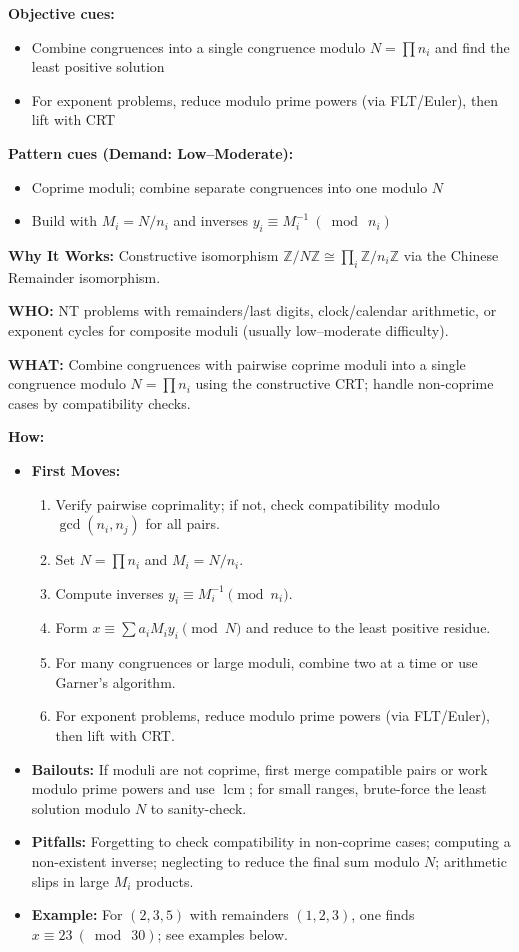 \documentclass[12pt]{article}
\begin{document}
\textbf{Objective cues:}
\begin{itemize}
    \item Combine congruences into a single congruence modulo $N=\prod n_i$ and find the least positive solution
    \item For exponent problems, reduce modulo prime powers (via FLT/Euler), then lift with CRT
\end{itemize}

\textbf{Pattern cues (Demand: Low–Moderate):}
\begin{itemize}
    \item Coprime moduli; combine separate congruences into one modulo $N$
    \item Build with $M_i=N/n_i$ and inverses $y_i\equiv M_i^{-1}\ (\bmod\ n_i)$
\end{itemize}

\textbf{Why It Works:} Constructive isomorphism $\mathbb{Z}/N\mathbb{Z} \cong \prod_i \mathbb{Z}/n_i\mathbb{Z}$ via the Chinese Remainder isomorphism.

\textbf{WHO:} NT problems with remainders/last digits, clock/calendar arithmetic, or exponent cycles for composite moduli (usually low–moderate difficulty).

\textbf{WHAT:} Combine congruences with pairwise coprime moduli into a single congruence modulo $N=\prod n_i$ using the constructive CRT; handle non-coprime cases by compatibility checks.


\textbf{How:}
\begin{itemize}
    \item \textbf{First Moves:}
    \begin{enumerate}[nosep]
        \item Verify pairwise coprimality; if not, check compatibility modulo $\gcd(n_i,n_j)$ for all pairs.
        \item Set $N=\prod n_i$ and $M_i=N/n_i$.
        \item Compute inverses $y_i\equiv M_i^{-1}\pmod{n_i}$.
        \item Form $x\equiv \sum a_iM_i y_i \pmod N$ and reduce to the least positive residue.
        \item For many congruences or large moduli, combine two at a time or use Garner's algorithm.
        \item For exponent problems, reduce modulo prime powers (via FLT/Euler), then lift with CRT.
    \end{enumerate}
    \item \textbf{Bailouts:} If moduli are not coprime, first merge compatible pairs or work modulo prime powers and use $\operatorname{lcm}$; for small ranges, brute-force the least solution modulo $N$ to sanity-check.
    \item \textbf{Pitfalls:} Forgetting to check compatibility in non-coprime cases; computing a non-existent inverse; neglecting to reduce the final sum modulo $N$; arithmetic slips in large $M_i$ products.
    \item \textbf{Example:} For $(2,3,5)$ with remainders $(1,2,3)$, one finds $x\equiv23\ (\bmod\ 30)$; see examples below.
\end{itemize}
\end{document}
